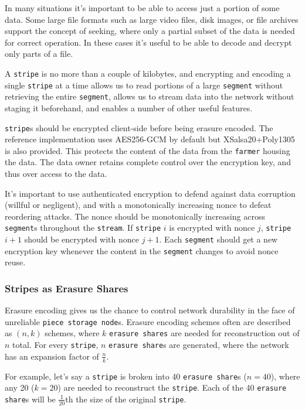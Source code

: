 \documentclass[a4paper,10pt]{article}
\newcommand{\x}[1]{{\tt #1}}
\begin{document}
In many situations it's important to be able to access just a portion of some
data. Some large file formats such as large video files, disk images, or file
archives support the concept of seeking, where only a partial subset of the
data is needed for correct operation. In these cases it's useful to be able to
decode and decrypt only parts of a file.

A \x{stripe} is no more than a couple of kilobytes, and encrypting and encoding
a single \x{stripe} at a time allows us to read portions of a large \x{segment}
without retrieving the entire \x{segment}, allows us to stream data into the
network without staging it beforehand, and enables a number of other useful
features.

\x{stripe}s should be encrypted client-side before being erasure encoded. The
reference implementation uses AES256-GCM by default but XSalsa20+Poly1305 is
also provided. This protects the content of the data from the \x{farmer} housing
the data. The data owner retains complete control over the encryption key, and
thus over access to the data.

It's important to use authenticated encryption to defend against data
corruption (willful or negligent), and with a monotonically increasing
nonce to defeat reordering attacks. The nonce should be monotonically increasing
across \x{segment}s throughout the \x{stream}. If \x{stripe} $i$ is encrypted
with nonce $j$, \x{stripe} $i+1$ should be encrypted with nonce $j+1$. Each
\x{segment} should get a new encryption key whenever the content in the
\x{segment} changes to avoid nonce reuse.

\subsubsection{Stripes as Erasure Shares}

Erasure encoding gives us the chance to control network durability in the face
of unreliable \x{piece storage node}s. Erasure encoding schemes often are
described as $(n, k)$ schemes, where $k$ \x{erasure shares} are needed for
reconstruction out of $n$ total. For every \x{stripe}, $n$ \x{erasure share}s
are generated, where the network has an expansion factor of $\frac{n}{k}$.

For example, let's say a \x{stripe} is broken into 40 \x{erasure share}s
($n=40$), where any 20 ($k=20$) are needed to reconstruct the \x{stripe}. Each
of the 40 \x{erasure share}s will be $\frac{1}{20}$th the size of the original
\x{stripe}.
\end{document}

